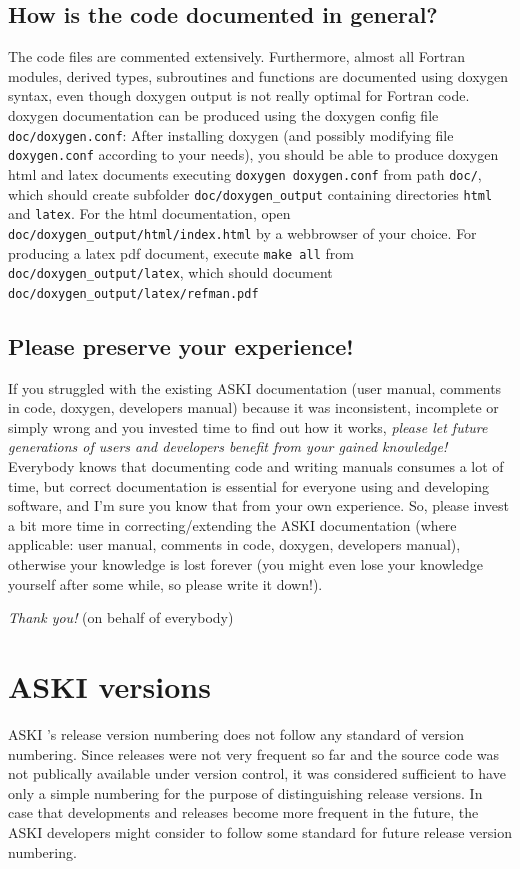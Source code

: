 \documentclass[12pt,a4paper]{article}
\newcommand{\lcode}[1]{\nolinkurl{#1}}
\newcommand{\ASKI}{ {\ttfamily ASKI} }
\begin{document}
\subsection*{How is the code documented in general?}
The code files are commented extensively. Furthermore, almost all Fortran modules, derived types, 
subroutines and functions are documented using doxygen syntax, even though doxygen output is not
really optimal for Fortran code. doxygen documentation can be produced using the doxygen config
file \lcode{doc/doxygen.conf}:
After installing doxygen (and possibly modifying file \lcode{doxygen.conf} according to your needs), 
you should be able to produce doxygen html and latex documents
executing \lcode{doxygen doxygen.conf} from path \lcode{doc/}, which should create subfolder \lcode{doc/doxygen_output} 
containing directories \lcode{html} and \lcode{latex}. For the html documentation, open
\lcode{doc/doxygen_output/html/index.html} by a webbrowser of your choice. For producing a latex pdf document, 
execute \lcode{make all} from \lcode{doc/doxygen_output/latex}, which should document 
\lcode{doc/doxygen_output/latex/refman.pdf}

\subsection*{Please preserve your experience!}
If you struggled with the existing \ASKI{} documentation (user manual, comments in code, doxygen, developers 
manual) because it was inconsistent, incomplete or simply wrong and you invested time to find out how it works, 
\emph{please let future generations of users and developers benefit from your gained knowledge!}
Everybody knows that documenting code and writing manuals consumes a lot of time, but correct documentation 
is essential for everyone using and developing software, and I'm sure you know that from your own experience.
So, please invest a bit more time in correcting/extending the \ASKI{} documentation
(where applicable: user manual, comments in code, doxygen, developers manual), otherwise your knowledge
is lost forever (you might even lose your knowledge yourself after some while, so please write it down!).

\emph{Thank you!} (on behalf of everybody)

%
\section{\ASKI{} versions}
%
\ASKI{}'s release version numbering does not follow any standard of version numbering. 
Since releases were not very frequent so far and the source code was not publically available under version control, 
it was considered sufficient to have only a simple numbering for the purpose of distinguishing release versions.
In case that developments and releases become more frequent in the future, the \ASKI{} developers might consider
to follow some standard for future release version numbering.
\end{document}
